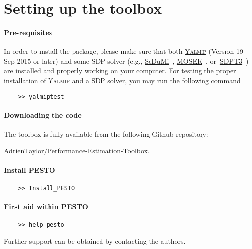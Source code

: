 \documentclass[11pt,a4paper]{article}
\newcommand{\pesto}{{PESTO }}
\begin{document}
	\clearpage
	\section{Setting up the toolbox}		%


	\paragraph{Pre-requisites} In order to install the package, please make sure that both \href{https://yalmip.github.io/}{\textsc{Yalmip}} (Version 19-Sep-2015 or later) and some SDP solver (e.g., \href{http://sedumi.ie.lehigh.edu/}{SeDuMi}~\cite{Article:Sedumi}, \href{https://mosek.com/}{MOSEK}~\cite{Article:Mosek}, or~\href{http://www.math.nus.edu.sg/~mattohkc/sdpt3.html}{SDPT3}~\cite{Article:sdpt3}) are installed and properly working on your computer. For testing the proper installation of \textsc{Yalmip} and a SDP solver, you may run the following command
	\begin{verbatim}
	>> yalmiptest
	\end{verbatim}
	\paragraph{Downloading the code} The toolbox is fully available from the following {\sc Github} repository: \begin{center}
		\href{https://github.com/AdrienTaylor/Performance-Estimation-Toolbox}{\sc AdrienTaylor/Performance-Estimation-Toolbox}.\\
	\end{center}

	\paragraph{Install \pesto}
	\begin{verbatim}
	>> Install_PESTO
	\end{verbatim}

	\paragraph{First aid within \pesto}
	\begin{verbatim}
	>> help pesto
	\end{verbatim}
	Further support can be obtained by contacting the authors.
\end{document}
